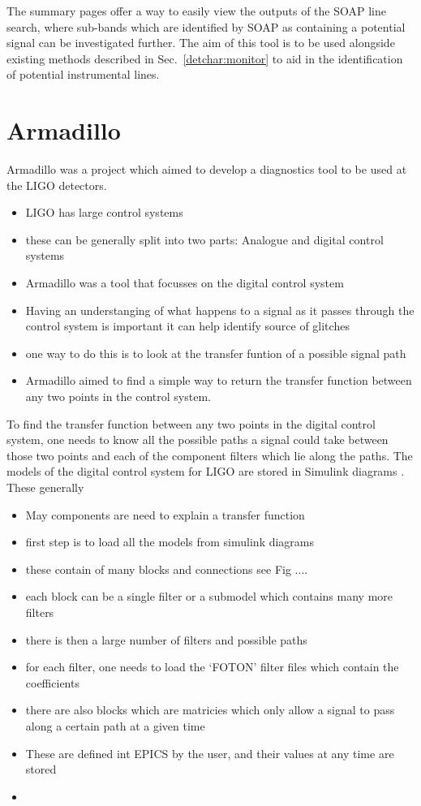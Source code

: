 The summary pages offer a way to easily view the outputs of the SOAP line search, where sub-bands which are identified by SOAP as containing a potential signal can be investigated further. 
The aim of this tool is to be used alongside existing methods described in Sec.~\ref{detchar:monitor} to aid in the identification of potential instrumental lines.


\clearpage

\section{Armadillo}

Armadillo was a project which aimed to develop a diagnostics tool to be used at the \gls{LIGO} detectors.

\begin{itemize}
	\item LIGO has large control systems
	\item these can be generally split into two parts: Analogue and digital control systems
	\item Armadillo was a tool that focusses on the digital control system
	\item Having an understanging of what happens to a signal as it passes through the control system is important it can help identify source of glitches
	\item one way to do this is to look at the transfer funtion of a possible signal path 
	\item Armadillo aimed to find a simple way to return the transfer function between any two points in the control system.
\end{itemize}


To find the transfer function between any two points in the digital control system, one needs to know all the possible paths a signal could take between those two points and each of the component filters which lie along the paths.
The models of the digital control system for \gls{LIGO} are stored in Simulink diagrams \citep{}.
These generally 

\begin{itemize}
	\item May components are need to explain a transfer function
	\item first step is to load all the models from simulink diagrams
	\item these contain of many blocks and connections see Fig ....
	\item each block can be a single filter or a submodel which contains many more filters
	\item there is then a large number of filters and possible paths
	\item for each filter, one needs to load the `FOTON' filter files which contain the coefficients 
	\item there are also blocks which are matricies which only allow a signal to pass along a certain path at a given time
	\item These are defined int EPICS by the user, and their values at any time are stored
	\item 
\end{itemize}

